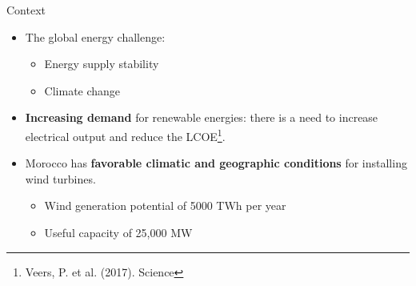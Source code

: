\documentclass[10pt]{beamer}
\begin{document}
\begin{frame}{Context}

\begin{itemize}
\justifying
\item[\ding{113}] The global energy challenge:
\begin{itemize}
\justifying
\item[\ding{252}] Energy supply stability
\item[\ding{252}] Climate change
\end{itemize}

\item[\ding{113}] \textbf{Increasing demand} for renewable energies: there is a need to increase electrical output and reduce the LCOE\footnote[frame]{\tiny\color{um6pcolor} Veers, P. et al. (2017). Science}.

\item[\ding{113}] Morocco has \textbf{favorable climatic and geographic conditions} for installing wind turbines.
\begin{itemize}
\justifying
\item[\ding{252}] Wind generation potential of 5000 TWh per year
\item[\ding{252}] Useful capacity of 25,000 MW
\end{itemize}
\end{itemize}

\noindent\makebox[\linewidth]{\rule{\paperwidth}{0.4pt}}


\end{frame}
\end{document}
